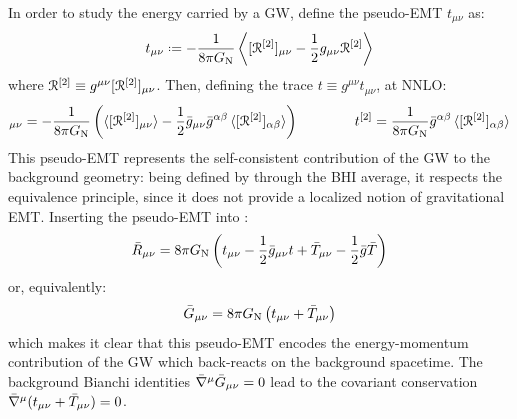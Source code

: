 
In order to study the energy carried by a GW, define the pseudo-EMT $ t_{\mu \nu} $ as:
\begin{equation}
  t_{\mu \nu} \defeq - \frac{1}{8\pi \gn} \left\langle [\rr\od2]_{\mu \nu} - \frac{1}{2} g_{\mu \nu} \rr\od2 \right\rangle
  \label{eq:pseudo-emt-def}
\end{equation}
where $ \EuScript{R}^{[2]} \equiv g^{\mu \nu} [\EuScript{R}^{[2]}]_{\mu \nu} $. Then, defining the trace $ t \equiv g^{\mu \nu} t_{\mu \nu} $, at NNLO:
\begin{equation*}
  [t\od2]_{\mu \nu} = - \frac{1}{8\pi \gn} \left( \braket{[\rr\od2]_{\mu \nu}} - \frac{1}{2} \bar{g}_{\mu \nu} \bar{g}^{\alpha \beta} \braket{[\rr\od2]_{\alpha \beta}} \right)
  \qquad \qquad
  t\od2 = \frac{1}{8\pi \gn} \bar{g}^{\alpha \beta} \braket{[\rr\od2]_{\alpha \beta}}
\end{equation*}
This pseudo-EMT represents the self-consistent contribution of the GW to the background geometry: being defined by through the BHI average, it respects the equivalence principle, since it does not provide a localized notion of gravitational EMT. Inserting the pseudo-EMT into :
\begin{equation*}
  \bar{R}_{\mu \nu} = 8\pi G_\text{N} \left( t_{\mu \nu} - \frac{1}{2} \bar{g}_{\mu \nu} t + \bar{T}_{\mu \nu} - \frac{1}{2} \bar{g} \bar{T} \right)
\end{equation*}
or, equivalently:
\begin{equation}
  \bar{G}_{\mu \nu} = 8\pi G_\text{N} \left( t_{\mu \nu} + \bar{T}_{\mu \nu} \right)
\end{equation}
which makes it clear that this pseudo-EMT encodes the energy-momentum contribution of the GW which back-reacts on the background spacetime. The background Bianchi identities $ \bar{\nabla}^\mu \bar{G}_{\mu \nu} = 0 $ lead to the covariant conservation $ \bar{\nabla}^\mu (t_{\mu \nu} + \bar{T}_{\mu \nu}) = 0 $.

